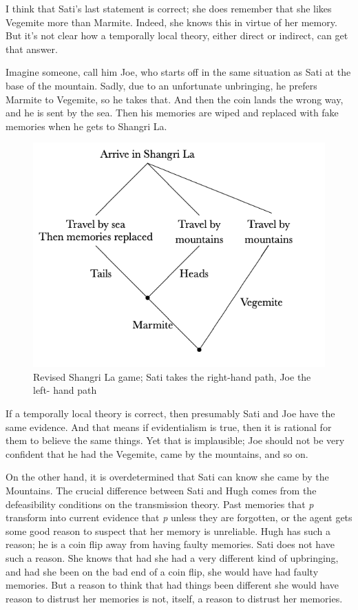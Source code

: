 \documentclass[
  10pt,
  letterpaper,
  DIV=11,
  numbers=noendperiod,
  twoside]{scrartcl}
\begin{document}
I think that Sati's last statement is correct; she does remember that
she likes Vegemite more than Marmite. Indeed, she knows this in virtue
of her memory. But it's not clear how a temporally local theory, either
direct or indirect, can get that answer.

Imagine someone, call him Joe, who starts off in the same situation as
Sati at the base of the mountain. Sadly, due to an unfortunate
unbringing, he prefers Marmite to Vegemite, so he takes that. And then
the coin lands the wrong way, and he is sent by the sea. Then his
memories are wiped and replaced with fake memories when he gets to
Shangri La.

\begin{figure}[H]

{\centering \includegraphics{images/mbt-fig2.png}

}

\caption{Revised Shangri La game; Sati takes the right-hand path, Joe
the left- hand path}

\end{figure}%

If a temporally local theory is correct, then presumably Sati and Joe
have the same evidence. And that means if evidentialism is true, then it
is rational for them to believe the same things. Yet that is
implausible; Joe should not be very confident that he had the Vegemite,
came by the mountains, and so on.

On the other hand, it is overdetermined that Sati can know she came by
the Mountains. The crucial difference between Sati and Hugh comes from
the defeasibility conditions on the transmission theory. Past memories
that \emph{p} transform into current evidence that \emph{p} unless they
are forgotten, or the agent gets some good reason to suspect that her
memory is unreliable. Hugh has such a reason; he is a coin flip away
from having faulty memories. Sati does not have such a reason. She knows
that had she had a very different kind of upbringing, and had she been
on the bad end of a coin flip, she would have had faulty memories. But a
reason to think that had things been different she would have reason to
distrust her memories is not, itself, a reason to distrust her memories.
\end{document}
